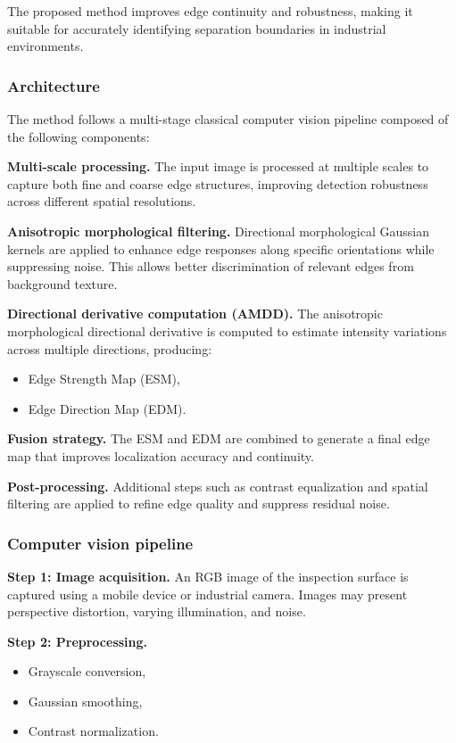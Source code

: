 \documentclass[11pt]{article}
\begin{document}
The proposed method improves edge continuity and robustness, making it suitable for accurately identifying separation boundaries in industrial environments.

\subsubsection{Architecture}

The method follows a multi-stage classical computer vision pipeline composed of the following components:

\textbf{Multi-scale processing.} The input image is processed at multiple scales to capture both fine and coarse edge structures, improving detection robustness across different spatial resolutions.

\textbf{Anisotropic morphological filtering.} Directional morphological Gaussian kernels are applied to enhance edge responses along specific orientations while suppressing noise. This allows better discrimination of relevant edges from background texture.

\textbf{Directional derivative computation (AMDD).} The anisotropic morphological directional derivative is computed to estimate intensity variations across multiple directions, producing:
\begin{itemize}
    \item Edge Strength Map (ESM),
    \item Edge Direction Map (EDM).
\end{itemize}

\textbf{Fusion strategy.} The ESM and EDM are combined to generate a final edge map that improves localization accuracy and continuity.

\textbf{Post-processing.} Additional steps such as contrast equalization and spatial filtering are applied to refine edge quality and suppress residual noise.

\subsubsection{Computer vision pipeline}

\textbf{Step 1: Image acquisition.} An RGB image of the inspection surface is captured using a mobile device or industrial camera. Images may present perspective distortion, varying illumination, and noise.

\textbf{Step 2: Preprocessing.}
\begin{itemize}
    \item Grayscale conversion,
    \item Gaussian smoothing,
    \item Contrast normalization.
\end{itemize}
\end{document}
